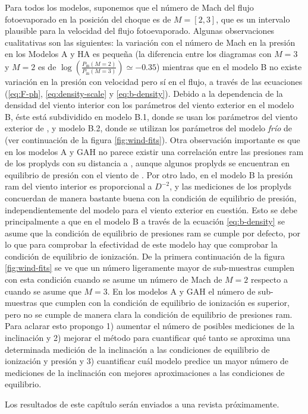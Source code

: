 Para todos los modelos, suponemos que el número de Mach del flujo fotoevaporado en la posición del choque es de $M=[2, 3]$, que es un intervalo plausible para la velocidad del flujo fotoevaporado. Algunas observaciones cualitativas son las siguientes: la variación con el número de Mach en la presión en los Modelos A y HA es pequeña (la diferencia entre los diagramas con $M=3$ y $M=2$ es de $\log\left(\frac{P_{\mathrm{in}}(M=2)}{P_{\mathrm{in}}(M=3)}\right)\simeq -0.35$) mientras que en el modelo B no existe variación en la presión con velocidad pero sí en el flujo, a través de las ecuaciones (\ref{eq:F-ph}, \ref{eq:density-scale} y \ref{eq:b-density}). Debido a la dependencia de la densidad del viento interior con los parámetros del viento exterior en el modelo B, éste está subdividido en modelo B.1, donde se usan los parámetros del viento exterior de \citet{GAH:2002}, y modelo B.2, donde se utilizan los parámetros del modelo \textit{frío} de \citet{Gagne:2005} (ver continuación de la figura \ref{fig:wind-fits}). Otra observación importante es que en los modelos A y GAH no parece existir una correlación entre las presiones ram de los proplyds con su distancia a \thC{}, aunque algunos proplyds se encuentran en equilibrio de presión con el viento de \thC{}. Por otro lado, en el modelo B la presión ram del viento interior es proporcional a $D^{-2}$, y las mediciones de los proplyds concuerdan de manera bastante buena con la condición de equilibrio de presión, independientemente del modelo para el viento exterior en cuestión. Esto se debe principalmente a que en el modelo B a través de la ecuación \ref{eq:b-density} se asume que la condición de equilibrio de presiones ram se cumple por defecto, por lo que para comprobar la efectividad de este modelo hay que comprobar la condición de equilibrio de ionización. De la primera continuación de la figura \ref{fig:wind-fits} se ve que un número ligeramente mayor de sub-muestras cumplen con esta condición cuando se asume un número de Mach de $M=2$ respecto a cuando se asume que $M=3$. En los modelos A y GAH el número de sub-muestras que cumplen con la condición de equilibrio de ionización es superior, pero no se cumple de manera clara la condición de equilibrio de presiones ram. Para aclarar esto propongo 1) aumentar el número de posibles mediciones de la inclinación y 2) mejorar el método para cuantificar qué tanto se aproxima una determinada medición de la inclinación a las condiciones de equilibrio de ionización y presión y 3) cuantificar cuál modelo predice un mayor número de mediciones de la inclinación con mejores aproximaciones a las condiciones de equilibrio.%

Los resultados de este capítulo serán enviados a una revista próximamente.
